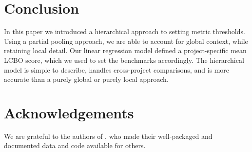 \documentclass[sigconf,natbib=false]{acmart}
\begin{document}
\section{Conclusion}
In this paper we introduced a hierarchical approach to setting metric thresholds. Using a partial pooling approach, we are able to account for global context, while retaining local detail. Our linear regression model defined a project-specific mean LCBO score, which we used to set the benchmarks accordingly. The hierarchical model is simple to describe, handles cross-project comparisons, and is more accurate than a purely global or purely local approach.

\section{Acknowledgements}
We are grateful to the authors of \cite{Aniche2016}, who made their well-packaged and documented data and code available for others.
 
\newpage
 \printbibliography 
\end{document}
